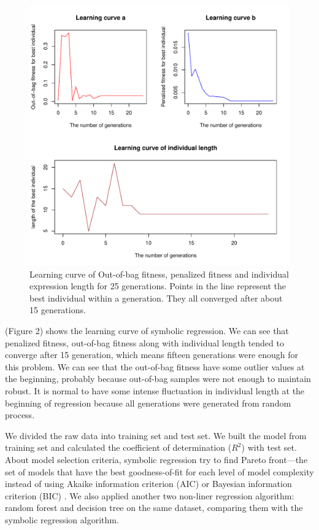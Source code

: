 \documentclass[11pt,a4paper]{article}
\begin{document}
\begin{figure}[h!]
\centering
\includegraphics[scale = 0.6]{../Results/log_of_regression.pdf}
\caption{Learning curve of Out-of-bag fitness, penalized fitness and individual expression length for 25 generations. Points in the line represent the best individual within a generation. They all converged after about 15 generations.}
\end{figure}
(Figure 2) shows the learning curve of symbolic regression. We can see that penalized fitness, out-of-bag fitness along with individual length tended to converge after 15 generation, which means fifteen generations were enough for this problem. We can see that the out-of-bag fitness have some outlier values at the beginning, probably because out-of-bag samples were not enough to maintain robust. It is normal to have some intense fluctuation in individual length at the beginning of regression because all generations were generated from random process. 

We divided the raw data into training set and test set. We built the model from training set and calculated the coefficient of determination ($R^{2}$) with test set. About model selection criteria, symbolic regression try to find Pareto front—the set of models that have the best goodness-of-fit for each level of model complexity instead of using Akaike information criterion (AIC) or Bayesian information criterion (BIC) \citep{BenjaminT.MartinStephanB.Munch2018}. We also applied another two non-liner regression algorithm: random forest \citep{Ho1995} and decision tree \citep{Kami2018} on the same dataset, comparing them with the symbolic regression algorithm.
\end{document}
